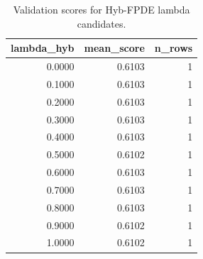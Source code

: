 \begin{table}[t]
\caption{Validation scores for Hyb-FPDE lambda candidates.}
\label{tab:lambda_distribution_computed}
\centering
\begin{tabular}{rrr}
\toprule
lambda\_hyb & mean\_score & n\_rows \\
\midrule
0.0000 & 0.6103 & 1 \\
0.1000 & 0.6103 & 1 \\
0.2000 & 0.6103 & 1 \\
0.3000 & 0.6103 & 1 \\
0.4000 & 0.6103 & 1 \\
0.5000 & 0.6102 & 1 \\
0.6000 & 0.6103 & 1 \\
0.7000 & 0.6103 & 1 \\
0.8000 & 0.6103 & 1 \\
0.9000 & 0.6102 & 1 \\
1.0000 & 0.6102 & 1 \\
\bottomrule
\end{tabular}

\end{table}
